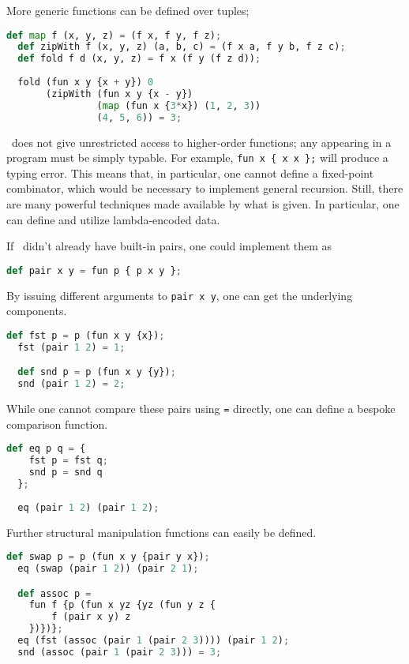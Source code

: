 More generic functions can be defined over tuples;

\begin{lstlisting}[language=Python]
  def map f (x, y, z) = (f x, f y, f z);
  def zipWith f (x, y, z) (a, b, c) = (f x a, f y b, f z c);
  def fold f d (x, y, z) = f x (f y (f z d));
  
  fold (fun x y {x + y}) 0
       (zipWith (fun x y {x - y}) 
                (map (fun x {3*x}) (1, 2, 3)) 
                (4, 5, 6)) = 3;
\end{lstlisting}

\vampir\ does not give unrestricted access to higher-order functions; any appearing in a program must be simply typable. For example, \lstinline|fun x { x x };| will produce a typing error. This means that, in particular, one cannot define a fixed-point combinator, which would be necessary to implement general recursion. Still, there are many powerful techniques made available by what is given. In particular, one can define and utilize lambda-encoded data.

If \vampir\ didn't already have built-in pairs, one could implement them as

\begin{lstlisting}[language=Python]
  def pair x y = fun p { p x y };
\end{lstlisting}

By issuing different arguments to \lstinline|pair x y|, one can get the underlying components.

\begin{lstlisting}[language=Python]
  def fst p = p (fun x y {x});
  fst (pair 1 2) = 1;

  def snd p = p (fun x y {y});
  snd (pair 1 2) = 2;
\end{lstlisting}

While one cannot compare these pairs using \lstinline|=| directly, one can define a bespoke comparison function.

\begin{lstlisting}[language=Python]
  def eq p q = {
    fst p = fst q; 
    snd p = snd q
  };
  
  eq (pair 1 2) (pair 1 2);
\end{lstlisting}

Further structural manipulation functions can easily be defined.

\begin{lstlisting}[language=Python]
  def swap p = p (fun x y {pair y x});
  eq (swap (pair 1 2)) (pair 2 1);

  def assoc p = 
    fun f {p (fun x yz {yz (fun y z {
        f (pair x y) z
    })})};
  eq (fst (assoc (pair 1 (pair 2 3)))) (pair 1 2);
  snd (assoc (pair 1 (pair 2 3))) = 3;
\end{lstlisting}

